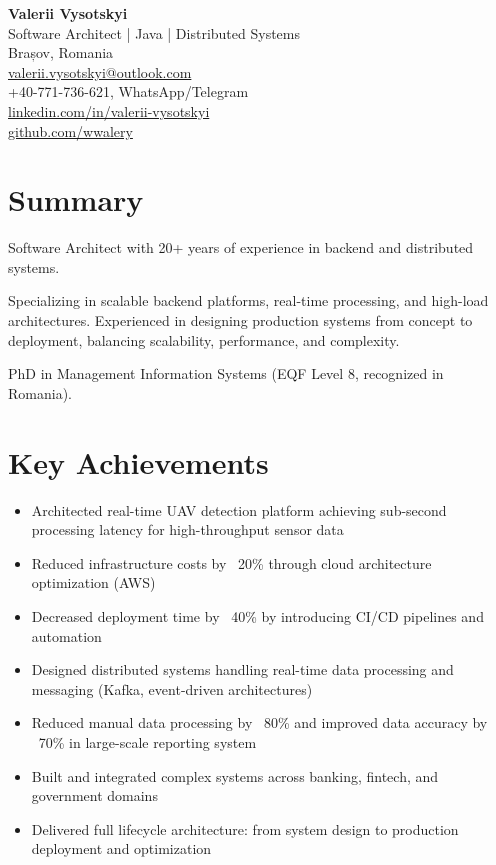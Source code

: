 \documentclass[10pt,a4paper]{article}
\begin{document}
{\LARGE \textbf{Valerii Vysotskyi}} \\[4pt]
\textcolor{accent}{Software Architect | Java | Distributed Systems} \\[6pt]

Brașov, Romania \\
\href{mailto:valerii.vysotskyi@outlook.com}{valerii.vysotskyi@outlook.com} \\
+40-771-736-621, WhatsApp/Telegram \\
\href{https://linkedin.com/in/valerii-vysotskyi}{linkedin.com/in/valerii-vysotskyi} \\
\href{https://github.com/wwalery}{github.com/wwalery}

\vspace{6pt}

\section*{Summary}

Software Architect with 20+ years of experience in backend and distributed systems.

Specializing in scalable backend platforms, real-time processing, and high-load architectures. Experienced in designing production systems from concept to deployment, balancing scalability, performance, and complexity.

PhD in Management Information Systems (EQF Level 8, recognized in Romania).


\section*{Key Achievements}

\begin{itemize}[leftmargin=*]
\item Architected real-time UAV detection platform achieving sub-second processing latency for high-throughput sensor data
\item Reduced infrastructure costs by ~20\% through cloud architecture optimization (AWS)
\item Decreased deployment time by ~40\% by introducing CI/CD pipelines and automation
\item Designed distributed systems handling real-time data processing and messaging (Kafka, event-driven architectures)
\item Reduced manual data processing by ~80\% and improved data accuracy by ~70\% in large-scale reporting system
\item Built and integrated complex systems across banking, fintech, and government domains
\item Delivered full lifecycle architecture: from system design to production deployment and optimization
\end{itemize}
\end{document}

